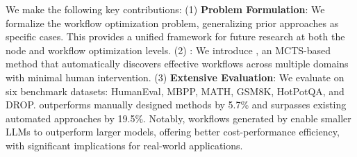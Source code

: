 
We make the following key contributions:
(1) \textbf{Problem Formulation}: We formalize the workflow optimization problem, generalizing prior approaches as specific cases. This provides a unified framework for future research at both the node and workflow optimization levels.
(2) \modelbold: We introduce \model, an MCTS-based method that automatically discovers effective workflows across multiple domains with minimal human intervention.
(3) \textbf{Extensive Evaluation}: We evaluate \model on six benchmark datasets: HumanEval, MBPP, MATH, GSM8K, HotPotQA, and DROP. \model outperforms manually designed methods by 5.7\% and surpasses existing automated approaches by 19.5\%. Notably, workflows generated by \model enable smaller LLMs to outperform larger models, offering better cost-performance efficiency, with significant implications for real-world applications.





